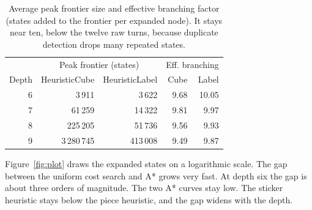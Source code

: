 \documentclass[11pt,a4paper]{article}
\begin{document}
\begin{table}[H]
\centering
\small
\begin{tabular}{r|rr|rr}
\toprule
 & \multicolumn{2}{c|}{Peak frontier (states)} & \multicolumn{2}{c}{Eff. branching} \\
Depth & HeuristicCube & HeuristicLabel & Cube & Label \\
\midrule
6 & 3\,911    & 3\,622    & 9.68 & 10.05 \\
7 & 61\,259   & 14\,322   & 9.81 & 9.97 \\
8 & 225\,205  & 51\,736   & 9.56 & 9.93 \\
9 & 3\,280\,745 & 413\,008 & 9.49 & 9.87 \\
\bottomrule
\end{tabular}
\caption{Average peak frontier size and effective branching factor (states added
to the frontier per expanded node). It stays near ten, below the twelve raw turns,
because duplicate detection drops many repeated states.}
\label{tab:memory}
\end{table}

Figure~\ref{fig:plot} draws the expanded states on a logarithmic scale. The gap
between the uniform cost search and A* grows very fast. At depth six the gap is
about three orders of magnitude. The two A* curves stay low. The sticker heuristic
stays below the piece heuristic, and the gap widens with the depth.
\end{document}
